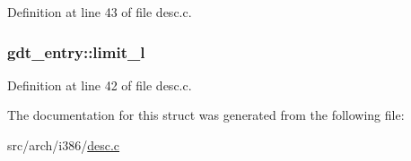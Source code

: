 Definition at line 43 of file desc.\+c.

\hypertarget{structgdt__entry_aac421dd71cee241d3c91179d679e477c}{
\subsubsection[{limit\+\_\+l}]{ gdt\+\_\+entry\+::limit\+\_\+l}}\label{structgdt__entry_aac421dd71cee241d3c91179d679e477c}


Definition at line 42 of file desc.\+c.



The documentation for this struct was generated from the following file\+:\begin{DoxyCompactItemize}
\item 
src/arch/i386/\hyperlink{desc_8c}{desc.\+c}\end{DoxyCompactItemize}
